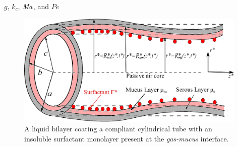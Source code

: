 $g$, $k_c$, $\mbox{\textit{Ma}}$, and $Pe$
\begin{figure}[h]
\begin{center}
\includegraphics[width=0.98\textwidth]{geometry_full.eps}
\end{center}
\caption{A liquid bilayer coating a compliant cylindrical tube with an insoluble surfactant monolayer present at the \textit{gas-mucus} interface.}
\label{fig:geometry}
\end{figure}
\lipsum 